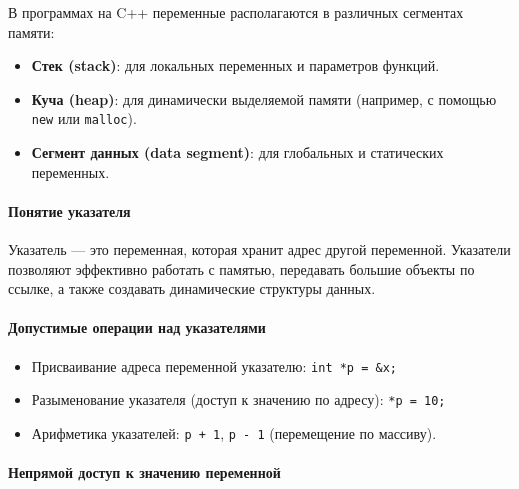\documentclass[
]{article}
\providecommand{\tightlist}{%
  \setlength{\itemsep}{0pt}\setlength{\parskip}{0pt}}
\begin{document}
В программах на C++ переменные располагаются в различных сегментах
памяти:

\begin{itemize}
\tightlist
\item
  \textbf{Стек (stack)}: для локальных переменных и параметров функций.
\item
  \textbf{Куча (heap)}: для динамически выделяемой памяти (например, с
  помощью \texttt{new} или \texttt{malloc}).
\item
  \textbf{Сегмент данных (data segment)}: для глобальных и статических
  переменных.
\end{itemize}

\paragraph{Понятие
указателя}\label{ux43fux43eux43dux44fux442ux438ux435-ux443ux43aux430ux437ux430ux442ux435ux43bux44f}

Указатель --- это переменная, которая хранит адрес другой переменной.
Указатели позволяют эффективно работать с памятью, передавать большие
объекты по ссылке, а также создавать динамические структуры данных.

\paragraph{Допустимые операции над
указателями}\label{ux434ux43eux43fux443ux441ux442ux438ux43cux44bux435-ux43eux43fux435ux440ux430ux446ux438ux438-ux43dux430ux434-ux443ux43aux430ux437ux430ux442ux435ux43bux44fux43cux438}

\begin{itemize}
\tightlist
\item
  Присваивание адреса переменной указателю: \texttt{int\ *p\ =\ \&x;}
\item
  Разыменование указателя (доступ к значению по адресу):
  \texttt{*p\ =\ 10;}
\item
  Арифметика указателей: \texttt{p\ +\ 1}, \texttt{p\ -\ 1} (перемещение
  по массиву).
\end{itemize}

\paragraph{Непрямой доступ к значению
переменной}\label{ux43dux435ux43fux440ux44fux43cux43eux439-ux434ux43eux441ux442ux443ux43f-ux43a-ux437ux43dux430ux447ux435ux43dux438ux44e-ux43fux435ux440ux435ux43cux435ux43dux43dux43eux439}
\end{document}
